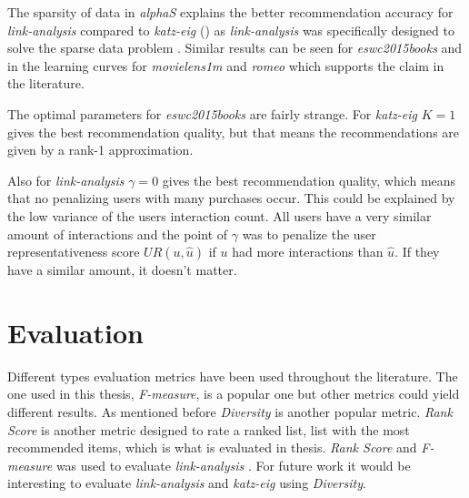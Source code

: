 The sparsity of data in \textit{alphaS} explains the better recommendation accuracy for \textit{link-analysis} compared to \textit{katz-eig} () as \textit{link-analysis} was specifically designed to solve the sparse data problem \citep{huang2004link, huang2007comparison}. Similar results can be seen for \textit{eswc2015books} and in the learning curves for \textit{movielens1m} and \textit{romeo} which supports the claim in the literature.

The optimal parameters for \textit{eswc2015books} are fairly strange. For \textit{katz-eig} $K = 1$ gives the best recommendation quality, but that means the recommendations are given by a rank-1 approximation.

Also for \textit{link-analysis} $\gamma = 0$ gives the best recommendation quality, which means that no penalizing users with many purchases occur. This could be explained by the low variance of the users interaction count. All users have a very similar amount of interactions and the point of $\gamma$ was to penalize the user representativeness score $UR(u, \hat{u})$ if $u$ had more interactions than $\hat{u}$. If they have a similar amount, it doesn't matter.


\section{Evaluation}

Different types evaluation metrics have been used throughout the literature. The one used in this thesis, \textit{F-measure}, is a popular one but other metrics could yield different results. As mentioned before \textit{Diversity} is another popular metric.  \textit{Rank Score} \cite{huang2007comparison} is another metric designed to rate a ranked list, list with the most recommended items, which is what is evaluated in thesis. \textit{Rank Score} and \textit{F-measure} was used to evaluate \textit{link-analysis} \cite{huang2007comparison}. For future work it would be interesting to evaluate \textit{link-analysis} and \textit{katz-eig} using \textit{Diversity}.






